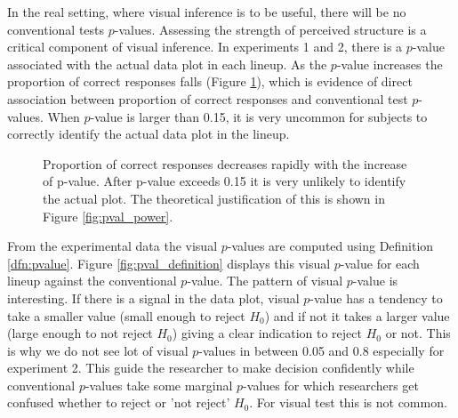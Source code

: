 \documentclass[12pt]{article}
\begin{document}
In the real setting, where visual inference is to be useful, there will be no conventional tests $p$-values. Assessing the strength of perceived structure is a critical component of visual inference. In experiments 1 and 2, there is a $p$-value associated with the actual data plot in each lineup. As the $p$-value increases the proportion of correct responses falls (Figure \ref{fig:pval_pcorrect}), which is evidence of direct association between proportion of correct responses and conventional test $p$-values. When $p$-value is larger than 0.15, it is very uncommon for subjects to correctly identify the actual data plot in the lineup.

\begin{figure}[hbtp]
   \centering
       \caption{Proportion of correct responses decreases rapidly with the increase of p-value. After p-value exceeds 0.15 it is very unlikely to identify the actual plot. The theoretical justification of this is shown in Figure \ref{fig:pval_power}. }
       \label{fig:pval_pcorrect}
\end{figure}

From the experimental data the visual $p$-values are computed using Definition \ref{dfn:pvalue}. Figure \ref{fig:pval_definition} displays this visual $p$-value for each lineup against the conventional $p$-value.  The pattern of visual $p$-value is interesting. If there is a signal in the data plot, visual $p$-value has a tendency to take a smaller value (small enough to reject $H_0$) and if not it takes a larger value (large enough to not reject $H_0$) giving a clear indication to reject $H_0$ or not. This is why we do not see lot of visual $p$-values in between 0.05 and 0.8 especially for experiment 2. This guide the researcher to make decision confidently while conventional $p$-values take some marginal $p$-values for which researchers get confused whether to reject or 'not reject' $H_0$. For visual test this is not common.  
\end{document}
